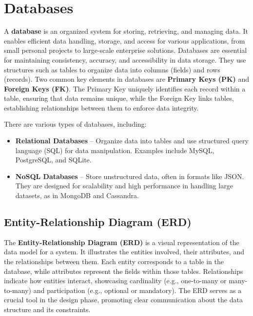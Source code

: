 \section{Databases}

A \textbf{database} is an organized system for storing, retrieving, and managing data. It enables efficient data handling, storage, and access for various applications, from small personal projects to large-scale enterprise solutions. Databases are essential for maintaining consistency, accuracy, and accessibility in data storage. They use structures such as tables to organize data into columns (fields) and rows (records). Two common key elements in databases are \textbf{Primary Keys (PK)} and \textbf{Foreign Keys (FK)}. The Primary Key uniquely identifies each record within a table, ensuring that data remains unique, while the Foreign Key links tables, establishing relationships between them to enforce data integrity.

There are various types of databases, including:
\begin{itemize}
	\item \textbf{Relational Databases} – Organize data into tables and use structured query language (SQL) for data manipulation. Examples include MySQL, PostgreSQL, and SQLite.
	\item \textbf{NoSQL Databases} – Store unstructured data, often in formats like JSON. They are designed for scalability and high performance in handling large datasets, as in MongoDB and Cassandra.
\end{itemize}

\subsection{Entity-Relationship Diagram (ERD)}
The \textbf{Entity-Relationship Diagram (ERD)} is a visual representation of the data model for a system. It illustrates the entities involved, their attributes, and the relationships between them. Each entity corresponds to a table in the database, while attributes represent the fields within those tables. Relationships indicate how entities interact, showcasing cardinality (e.g., one-to-many or many-to-many) and participation (e.g., optional or mandatory). The ERD serves as a crucial tool in the design phase, promoting clear communication about the data structure and its constraints.


